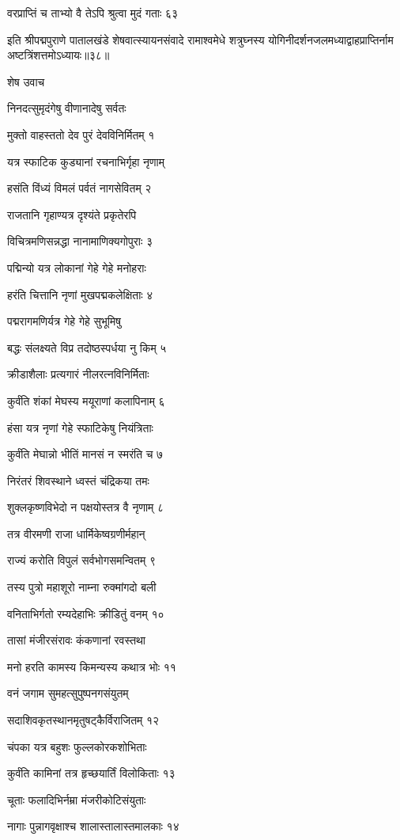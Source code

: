 वरप्राप्तिं च ताभ्यो वै तेऽपि श्रुत्वा मुदं गताः ६३

इति श्रीपद्मपुराणे पातालखंडे शेषवात्स्यायनसंवादे रामाश्वमेधे शत्रुघ्नस्य योगिनीदर्शनजलमध्याद्वाहप्राप्तिर्नाम अष्टत्रिंशत्तमोऽध्यायः॥३८॥


शेष उवाच

निनदत्सुमृदंगेषु वीणानादेषु सर्वतः

मुक्तो वाहस्ततो देव पुरं देवविनिर्मितम् १

यत्र स्फाटिक कुड्यानां रचनाभिर्गृहा नृणाम्

हसंति विंध्यं विमलं पर्वतं नागसेवितम् २

राजतानि गृहाण्यत्र दृश्यंते प्रकृतेरपि

विचित्रमणिसन्नद्धा नानामाणिक्यगोपुराः ३

पद्मिन्यो यत्र लोकानां गेहे गेहे मनोहराः

हरंति चित्तानि नृणां मुखपद्मकलेक्षिताः ४

पद्मरागमणिर्यत्र गेहे गेहे सुभूमिषु

बद्धः संलक्ष्यते विप्र तदोष्ठस्पर्धया नु किम् ५

क्रीडाशैलाः प्रत्यगारं नीलरत्नविनिर्मिताः

कुर्वंति शंकां मेघस्य मयूराणां कलापिनाम् ६

हंसा यत्र नृणां गेहे स्फाटिकेषु नियंत्रिताः

कुर्वंति मेघान्नो भीतिं मानसं न स्मरंति च ७

निरंतरं शिवस्थाने ध्वस्तं चंद्रिकया तमः

शुक्लकृष्णविभेदो न पक्षयोस्तत्र वै नृणाम् ८

तत्र वीरमणी राजा धार्मिकेष्वग्रणीर्महान्

राज्यं करोति विपुलं सर्वभोगसमन्वितम् ९

तस्य पुत्रो महाशूरो नाम्ना रुक्मांगदो बली

वनिताभिर्गतो रम्यदेहाभिः क्रीडितुं वनम् १०

तासां मंजीरसंरावः कंकणानां रवस्तथा

मनो हरति कामस्य किमन्यस्य कथात्र भोः ११

वनं जगाम सुमहत्सुपुष्पनगसंयुतम्

सदाशिवकृतस्थानमृतुषट्कैर्विराजितम् १२

चंपका यत्र बहुशः फुल्लकोरकशोभिताः

कुर्वंति कामिनां तत्र हृच्छयार्तिं विलोकिताः १३

चूताः फलादिभिर्नम्रा मंजरीकोटिसंयुताः

नागाः पुन्नागवृक्षाश्च शालास्तालास्तमालकाः १४

